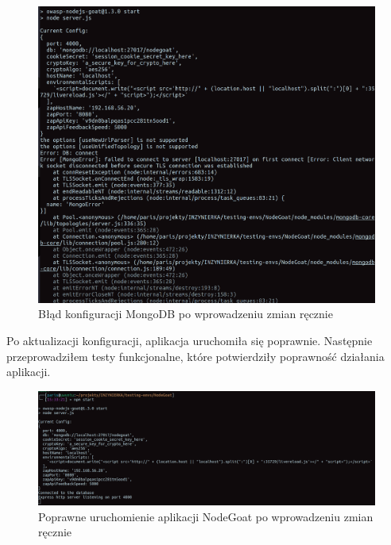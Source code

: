 \begin{figure}[H]
  \centering
  \includegraphics[width=\linewidth]{img/mongod-cert.png}
  \caption{Błąd konfiguracji MongoDB po wprowadzeniu zmian ręcznie}
  \label{fig:mongod-error}
\end{figure}

Po aktualizacji konfiguracji, aplikacja uruchomiła się poprawnie. Następnie przeprowadziłem testy funkcjonalne, które potwierdziły poprawność działania aplikacji.

\begin{figure}[H]
  \centering
  \includegraphics[width=\linewidth]{img/npm-start-success.png}
  \caption{Poprawne uruchomienie aplikacji NodeGoat po wprowadzeniu zmian ręcznie}
  \label{fig:nodegoat-success-manual}
\end{figure}

